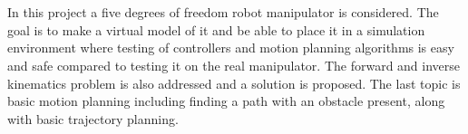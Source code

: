 \chapter*{\englishabstractname}
In this project a five degrees of freedom robot manipulator is considered. The goal is to make a virtual model of it and be able to place it in a simulation environment where testing of controllers and motion planning algorithms is easy and safe compared to testing it on the real manipulator. The forward and inverse kinematics problem is also addressed and a solution is proposed. The last topic is basic motion planning including finding a path with an obstacle present, along with basic trajectory planning.
\clearpage

